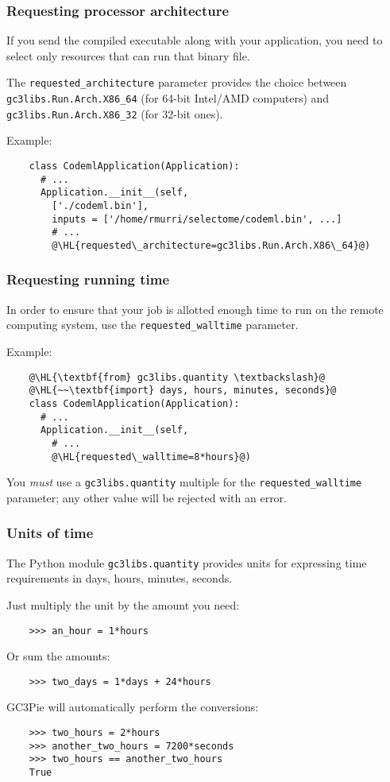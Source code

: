 \documentclass[english,serif,mathserif,xcolor=pdftex,dvipsnames,table]{beamer}
\begin{document}
\begin{frame}[fragile]
  \frametitle{Requesting processor architecture}
  
  If you send the compiled executable along with your application, you
  need to select only resources that can run that binary file.

  \+ 
  The \lstinline|requested_architecture| parameter provides the
  choice between \lstinline|gc3libs.Run.Arch.X86_64| (for 64-bit
  Intel/AMD computers) and \lstinline|gc3libs.Run.Arch.X86_32| (for
  32-bit ones).

  \+
  Example:
  \begin{lstlisting}
    class CodemlApplication(Application):
      # ...
      Application.__init__(self,
        ['./codeml.bin'],
        inputs = ['/home/rmurri/selectome/codeml.bin', ...]
        # ...
        @\HL{requested\_architecture=gc3libs.Run.Arch.X86\_64}@)
  \end{lstlisting}
\end{frame}

\begin{frame}[fragile]
  \frametitle{Requesting running time}

  In order to ensure that your job is allotted enough time to run on
  the remote computing system, use the \lstinline|requested_walltime|
  parameter.

  \+
  Example:
  \begin{lstlisting}
    @\HL{\textbf{from} gc3libs.quantity \textbackslash}@
    @\HL{~~\textbf{import} days, hours, minutes, seconds}@
    class CodemlApplication(Application):
      # ...
      Application.__init__(self,
        # ...
        @\HL{requested\_walltime=8*hours}@)
  \end{lstlisting}

  \+ 
  You \emph{must} use a \texttt{gc3libs.quantity} multiple for the
  \lstinline|requested_walltime| parameter; any other value will be
  rejected with an error.
\end{frame}

\begin{frame}[fragile]
  \frametitle{Units of time}
  The Python module \texttt{gc3libs.quantity} provides units for
  expressing time requirements in days, hours, minutes, seconds.

  \+
  Just multiply the unit by the amount you need:
  \begin{lstlisting}
    >>> an_hour = 1*hours
  \end{lstlisting}
  Or sum the amounts:
  \begin{lstlisting}
    >>> two_days = 1*days + 24*hours
  \end{lstlisting}

  \+
  GC3Pie will automatically perform the conversions:
  \begin{lstlisting}
    >>> two_hours = 2*hours
    >>> another_two_hours = 7200*seconds
    >>> two_hours == another_two_hours
    True
  \end{lstlisting}
\end{frame}
\end{document}
